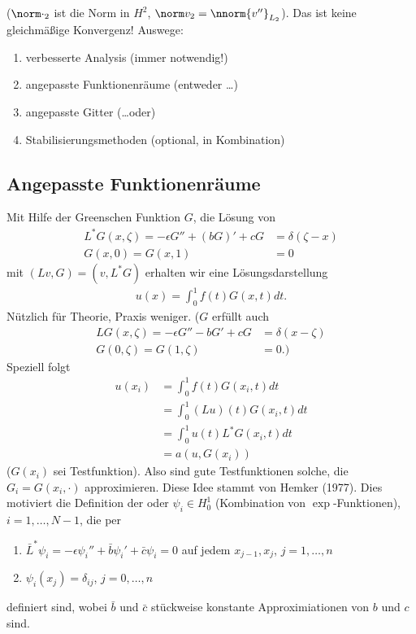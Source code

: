 ($\norm \cdot_{2}$ ist die Norm in $H^2$, $\norm v_{2} = \nnorm {v''}_{L_{2}}$). 
Das ist keine gleichmäßige Konvergenz! Auswege:
\begin{enumerate}
\item verbesserte Analysis (immer notwendig!)
\item angepasste Funktionenräume (entweder \dots)
\item angepasste Gitter (\dots oder)
\item Stabilisierungsmethoden (optional, in Kombination)
\end{enumerate}

\subsection{Angepasste Funktionenräume}
\label{sec:angep-funkt}

Mit Hilfe der Greenschen Funktion $G$, die Lösung von
\begin{align*}
  L^{*}G(x, \zeta) = - \epsilon G'' + (bG)' + cG &= \delta(\zeta-x)\\
  G(x, 0) = G(x, 1) &= 0
\end{align*}
mit $(Lv, G) = (v, L^{*}G)$ erhalten wir eine Lösungsdarstellung
\begin{align*}
  u(x) = \int_{0}^{1}f(t) G(x, t)dt. 
\end{align*}
Nützlich für Theorie, Praxis weniger. 
($G$ erfüllt auch
\begin{align*}
  LG(x, \zeta) = - \epsilon G'' - bG' + cG &= \delta(x - \zeta)\\
  G(0, \zeta) = G(1, \zeta) &= 0. )
\end{align*}
Speziell folgt
\begin{align*}
  u(x_{i}) &= \int_{0}^{1}f(t) G(x_{i}, t)dt\\
  &= \int_{0}^{1}(Lu)(t) G(x_{i}, t) dt\\
  &= \int_{0}^{1}u(t) L^{*}G(x_{i}, t) dt\\
  &= a (u, G(x_{i}))
\end{align*}
($G(x_{i})$ sei Testfunktion). 
Also sind gute Testfunktionen solche, die $G_{i} = G(x_{i}, \cdot)$ approximieren. Diese Idee stammt von Hemker (1977).  Dies motiviert die Definition der  oder  $\psi_{i} \in H_{0}^{1}$ (Kombination von $\exp$-Funktionen), $i= 1, \dots, N-1$, die per
\begin{enumerate}
\item $\bar L^{*} \psi_{i} = - \epsilon \psi_{i}'' + \bar b \psi_{i}' + \bar c \psi_{i} = 0$
  auf jedem $x_{j-1}, x_{j}$, $j = 1, \dots, n$
\item $\psi_{i}(x_{j}) = \delta_{ij}$, $j = 0, \dots, n$
\end{enumerate}
definiert sind, wobei $\bar b$ und $\bar c$ stückweise konstante Approximiationen von $b$ und $c$ sind. 

